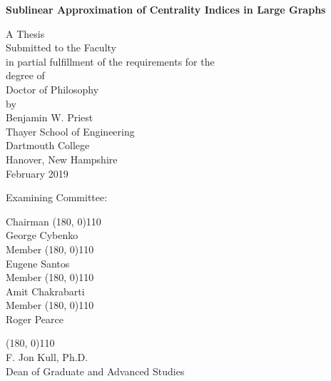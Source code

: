 \documentclass[10]{report}
\begin{document}
\begin{onehalfspace}
\begin{center}
\textbf{Sublinear Approximation of Centrality Indices in Large Graphs}
\vspace{0.4cm}

A Thesis \\
Submitted to the Faculty \\
in partial fulfillment of the requirements for the \\
degree of \\[0.4cm]
Doctor of Philosophy \\[0.4cm]
by\\[0.5cm]
Benjamin W. Priest\\[0.4cm]
Thayer School of Engineering \\
Dartmouth College \\
Hanover, New Hampshire \\[0.4cm]
February 2019 
\vspace{0.5cm}

\end{center}

Examining Committee:

\begin{flushright}
Chairman \line(180, 0){110} \\
George Cybenko\\[1cm]

Member \line(180, 0){110} \\
Eugene Santos\\[1cm]

Member \line(180, 0){110} \\
Amit Chakrabarti \\[1cm]

Member \line(180, 0){110} \\
Roger Pearce\\[1cm]


\end{flushright}

\begin{flushleft}
\line(180, 0){110} \\
F. Jon Kull, Ph.D.\\
Dean of Graduate and Advanced Studies\\[1cm]
\end{flushleft}

\end{onehalfspace}
\end{document}
